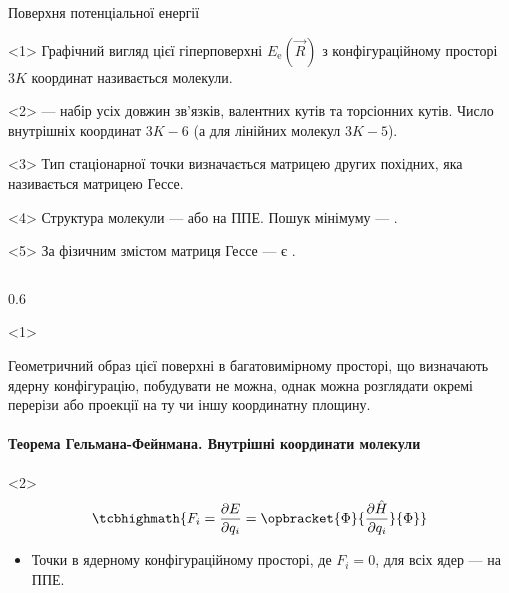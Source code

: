 \documentclass[]{beamer}
\begin{document}
\begin{frame}[t]{Поверхня потенціальної енергії}{}
	\begin{onlyenv}
		Графічний вигляд цієї гіперповерхні $E_\mathrm{e}(\vec{R})$ з конфігураційному просторі $3K$ координат називається  молекули.
	\end{onlyenv}
	\begin{onlyenv}
		 --- набір усіх довжин зв'язків, валентних кутів та торсіонних кутів.  Число внутрішніх координат $3K - 6$ (а для лінійних молекул $3K - 5$).
	\end{onlyenv}
	\begin{onlyenv}
		Тип стаціонарної точки визначається матрицею других похідних, яка називається матрицею Гессе.
	\end{onlyenv}
	\begin{onlyenv}
		Структура молекули ---  або  на ППЕ. Пошук мінімуму --- .
	\end{onlyenv}
	\begin{onlyenv}
		За фізичним змістом матриця Гессе ---  є .
	\end{onlyenv}
	\begin{columns}
		\begin{column}{0.6\linewidth}
			\begin{onlyenv}<1>
				\begin{block}{}
					Геометричний образ цієї поверхні в багатовимірному просторі, що визначають ядерну конфігурацію, побудувати не можна, однак можна розглядати окремі перерізи або проекції на ту чи іншу координатну площину.
				\end{block}
			\end{onlyenv}
			\framesubtitle<2>{Теорема Гельмана-Фейнмана. Внутрішні координати молекули}
			\begin{onlyenv}<2>
				\begin{equation*}
					\tcbhighmath{F_i = \frac{\partial E}{\partial q_i} = \opbracket{\Phi}{\frac{\partial \hat{H}}{\partial q_i}}{\Phi}}
				\end{equation*}
				\begin{itemize}\small
					\item  Точки в ядерному конфігураційному просторі, де $F_i = 0$, для всіх ядер --- \emphs{стаціонарні точки} на ППЕ.

\end{itemize}
\end{onlyenv}
\end{column}
\end{columns}
\end{frame}
\end{document}
